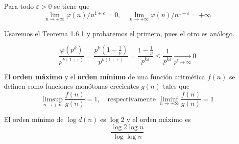 \documentclass[TAN.tex]{subfiles}
\begin{document}
\begin{prop}
Para todo $\varepsilon > 0$ se tiene que
\[ \lim_{n \to +∞} φ(n)/n^{1+\varepsilon} =0, \quad \lim_{n \to +∞} φ(n)/n^{1-\varepsilon} = +∞ \]
\end{prop}
\begin{dem}
Usaremos el Teorema 1.6.1 y probaremos el primero, pues el otro es análogo.

$$
\frac{\varphi(p^k)}{p^{k(1+\varepsilon)}} = \frac{p^k(1-\frac{1}{p})}{p^{k(1+\varepsilon)}} = \frac{1-\frac{1}{p}}{p^{k\varepsilon}} \leq \frac{1}{p^{k\varepsilon}} \underset{p^k\to \infty}{\longrightarrow} 0
$$
\end{dem}
El \textbf{orden máximo} y el \textbf{orden mínimo} de una función aritmética $f(n)$ se definen como funciones monótonas crecientes $g(n)$ tales que
\[ \limsup_{n\to+∞} \frac{f(n)}{g(n)} = 1, \quad \text{respectivamente }\liminf_{n\to+∞}\frac{f(n)}{g(n)} = 1 \]
\begin{prop}
El orden mínimo de $\log d(n)$ es $\log 2$ y el orden máximo es
\[ \frac{\log 2 \log n}{\log \log n} \]
\end{prop}
\end{document}
